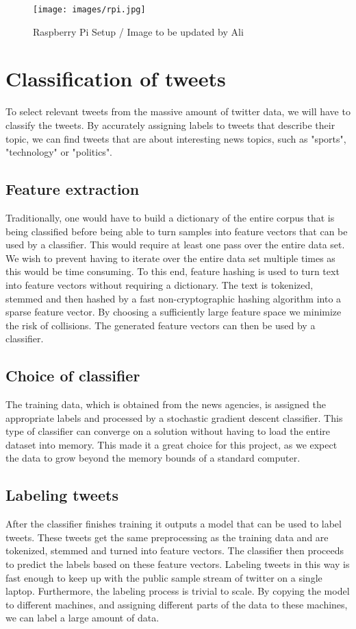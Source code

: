 \documentclass{llncs}
\begin{document}
\begin{figure}[H]
  \centering
  \texttt{[image: images/rpi.jpg]}
  \caption{Raspberry Pi Setup / Image to be updated by Ali}
  \label{fig:Raspberry Pi}
\end{figure}

\section{Classification of tweets}
To select relevant tweets from the massive amount of twitter data, we will have to classify the tweets. By accurately assigning labels to tweets that describe their topic, we can find tweets that are about interesting news topics, such as "sports", "technology" or "politics".

\subsection{Feature extraction}
Traditionally, one would have to build a dictionary of the entire corpus that is being classified before being able to turn samples into feature vectors that can be used by a classifier. This would require at least one pass over the entire data set. We wish to prevent having to iterate over the entire data set multiple times as this would be time consuming. To this end, feature hashing is used to turn text into feature vectors without requiring a dictionary. The text is tokenized, stemmed and then hashed by a fast non-cryptographic hashing algorithm into a sparse feature vector. By choosing a sufficiently large feature space we minimize the risk of collisions. The generated feature vectors can then be used by a classifier.

\subsection{Choice of classifier}
The training data, which is obtained from the news agencies, is assigned the appropriate labels and processed by a stochastic gradient descent classifier. This type of classifier can converge on a solution without having to load the entire dataset into memory. This made it a great choice for this project, as we expect the data to grow beyond the memory bounds of a standard computer.

\subsection{Labeling tweets}
After the classifier finishes training it outputs a model that can be used to label tweets. These tweets get the same preprocessing as the training data and are tokenized, stemmed and turned into feature vectors. The classifier then proceeds to predict the labels based on these feature vectors. Labeling tweets in this way is fast enough to keep up with the public sample stream of twitter on a single laptop. Furthermore, the labeling process is trivial to scale. By copying the model to different machines, and assigning different parts of the data to these machines, we can label a large amount of data.
\end{document}
